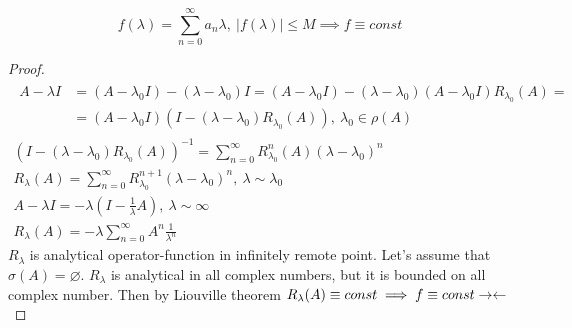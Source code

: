 \begin{thm}[Liouville]
  \[
    f(\lambda) = \sum_{n = 0}^\infty a_n \lambda,\ 
    |f(\lambda)| \leq M \implies f \equiv const
  \]
\end{thm}

\begin{proof}
  \begin{gather*}
    \begin{split}
      A - \lambda I & = (A - \lambda_0 I) - (\lambda - \lambda_0) I = (A - \lambda_0 I) - (\lambda - \lambda_0) (A - \lambda_0 I) R_{\lambda_0}(A) = {}\\
                    & = (A - \lambda_0 I)(I - (\lambda - \lambda_0)R_{\lambda_0}(A)),\ \lambda_0 \in \rho(A) 
    \end{split} \\
    (I - (\lambda - \lambda_0) R_{\lambda_0}(A))^{-1} = \sum_{n=0}^\infty R_{\lambda_0}^n(A)(\lambda - \lambda_0)^n \\
    R_\lambda(A)  = \sum_{n=0}^\infty R_{\lambda_0}^{n + 1} (\lambda - \lambda_0)^n,\ \lambda \sim \lambda_0 \\
    A - \lambda I = -\lambda(I - \tfrac 1\lambda A),\ \lambda \sim \infty \\
    R_\lambda(A)  = -\lambda \sum_{n = 0}^\infty A^n \frac{1}{\lambda^n}
  \end{gather*}
  $R_\lambda$ is analytical operator-function in infinitely remote point.
  Let's assume that $\sigma(A) = \varnothing$. 
  $R_\lambda$ is analytical in all complex numbers, but it is bounded on all
  complex number. Then by Liouville theorem $R_\lambda(A) \equiv const \implies
  f \equiv const \rightarrow\leftarrow$
\end{proof}
